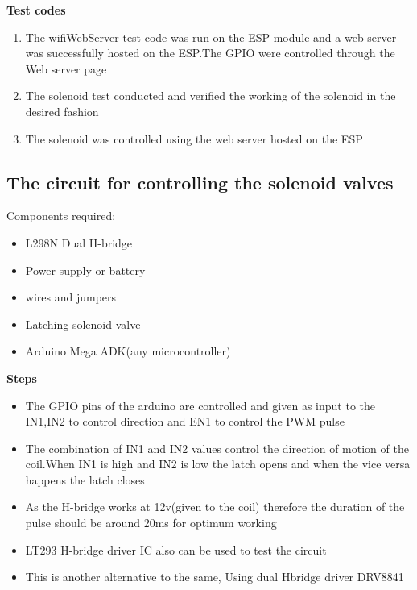 \documentclass[16pt]{article}
\begin{document}
\vspace{0.5cm}

\textbf{Test codes}

\begin{enumerate}

\item
  The wifiWebServer test code was run on the ESP module and a web server
  was successfully hosted on the ESP.The GPIO were controlled through
  the Web server page
\item
  The solenoid test conducted and verified the working of the solenoid
  in the desired fashion
\item
  The solenoid was controlled using the web server hosted on the ESP
\end{enumerate}

\vspace{0.5cm}

\subsection{The circuit for controlling the solenoid valves}

Components required:

\begin{itemize}

\item
  L298N Dual H-bridge
\item
  Power supply or battery
\item
  wires and jumpers
\item
  Latching solenoid valve
\item
  Arduino Mega ADK(any microcontroller)
\end{itemize}

\textbf{Steps}

\begin{itemize}

\item
  The GPIO pins of the arduino are controlled and given as input to the
  IN1,IN2 to control direction and EN1 to control the PWM pulse
\item
  The combination of IN1 and IN2 values control the direction of motion
  of the coil.When IN1 is high and IN2 is low the latch opens and when
  the vice versa happens the latch closes
\item
  As the H-bridge works at 12v(given to the coil) therefore the duration
  of the pulse should be around 20ms for optimum working
\item
  LT293 H-bridge driver IC also can be used to test the
  circuit%
\item
  This is another alternative to the same, Using dual Hbridge driver
  DRV8841
\end{itemize}
\end{document}
